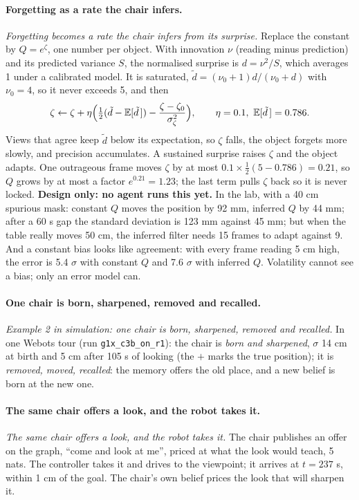 \documentclass[11pt]{article}
\newcommand{\slt}[1]{\emph{#1}}   %
\begin{document}
\paragraph{Forgetting as a rate the chair infers.} \slt{Forgetting becomes a rate the chair infers from its surprise.} Replace the constant by $Q=e^{\zeta}$, one number per object. With innovation $\nu$ (reading minus prediction) and its predicted variance $S$, the normalised surprise is $d=\nu^2/S$, which averages 1 under a calibrated model. It is saturated, $\tilde d=(\nu_0+1)d/(\nu_0+d)$ with $\nu_0=4$, so it never exceeds 5, and then
\[
\zeta\leftarrow\zeta+\eta\Big(\tfrac12(\tilde d-\mathbb{E}[\tilde d\,])-\frac{\zeta-\zeta_0}{\sigma_\zeta^2}\Big),\qquad \eta=0.1,\ \mathbb{E}[\tilde d\,]=0.786 .
\]
Views that agree keep $\tilde d$ below its expectation, so $\zeta$ falls, the object forgets more slowly, and precision accumulates. A sustained surprise raises $\zeta$ and the object adapts. One outrageous frame moves $\zeta$ by at most $0.1\times\tfrac12(5-0.786)=0.21$, so $Q$ grows by at most a factor $e^{0.21}=1.23$; the last term pulls $\zeta$ back so it is never locked. \textbf{Design only: no agent runs this yet.} In the lab, with a 40 cm spurious mask: constant $Q$ moves the position by 92 mm, inferred $Q$ by 44 mm; after a 60 s gap the standard deviation is 123 mm against 45 mm; but when the table really moves 50 cm, the inferred filter needs 15 frames to adapt against 9. And a constant bias looks like agreement: with every frame reading 5 cm high, the error is 5.4 $\sigma$ with constant $Q$ and 7.6 $\sigma$ with inferred $Q$. Volatility cannot see a bias; only an error model can.

\paragraph{One chair is born, sharpened, removed and recalled.} \slt{Example 2 in simulation: one chair is born, sharpened, removed and recalled.} In one Webots tour (run \texttt{g1x\_c3b\_on\_r1}): the chair is \emph{born and sharpened}, $\sigma$ 14 cm at birth and 5 cm after 105 s of looking (the $+$ marks the true position); it is \emph{removed, moved, recalled}: the memory offers the old place, and a new belief is born at the new one.

\paragraph{The same chair offers a look, and the robot takes it.} \slt{The same chair offers a look, and the robot takes it.} The chair publishes an offer on the graph, ``come and look at me'', priced at what the look would teach, 5 nats. The controller takes it and drives to the viewpoint; it arrives at $t=237$ s, within 1 cm of the goal. The chair's own belief prices the look that will sharpen it.
\end{document}
